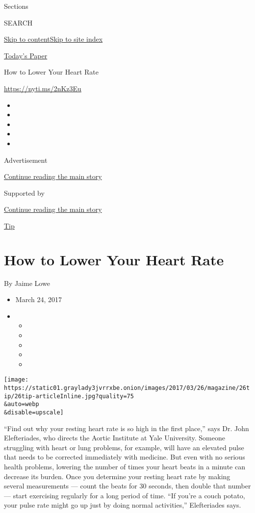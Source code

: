 Sections

SEARCH

\protect\hyperlink{site-content}{Skip to
content}\protect\hyperlink{site-index}{Skip to site index}

\href{https://myaccount.nytimes3xbfgragh.onion/auth/login?response_type=cookie\&client_id=vi}{}

\href{https://www.nytimes3xbfgragh.onion/section/todayspaper}{Today's
Paper}

How to Lower Your Heart Rate

\url{https://nyti.ms/2nKz3Eu}

\begin{itemize}
\item
\item
\item
\item
\item
\end{itemize}

Advertisement

\protect\hyperlink{after-top}{Continue reading the main story}

Supported by

\protect\hyperlink{after-sponsor}{Continue reading the main story}

\href{/column/magazine-tip}{Tip}

\hypertarget{how-to-lower-your-heart-rate}{%
\section{How to Lower Your Heart
Rate}\label{how-to-lower-your-heart-rate}}

By Jaime Lowe

\begin{itemize}
\item
  March 24, 2017
\item
  \begin{itemize}
  \item
  \item
  \item
  \item
  \item
  \end{itemize}
\end{itemize}

\texttt{[image: https://static01.graylady3jvrrxbe.onion/images/2017/03/26/magazine/26tip/26tip-articleInline.jpg?quality=75\\\&auto=webp\\\&disable=upscale]}

``Find out why your resting heart rate is so high in the first place,''
says Dr. John Elefteriades, who directs the Aortic Institute at Yale
University. Someone struggling with heart or lung problems, for example,
will have an elevated pulse that needs to be corrected immediately with
medicine. But even with no serious health problems, lowering the number
of times your heart beats in a minute can decrease its burden. Once you
determine your resting heart rate by making several measurements ---
count the beats for 30 seconds, then double that number --- start
exercising regularly for a long period of time. ``If you're a couch
potato, your pulse rate might go up just by doing normal activities,''
Elefteriades says.

